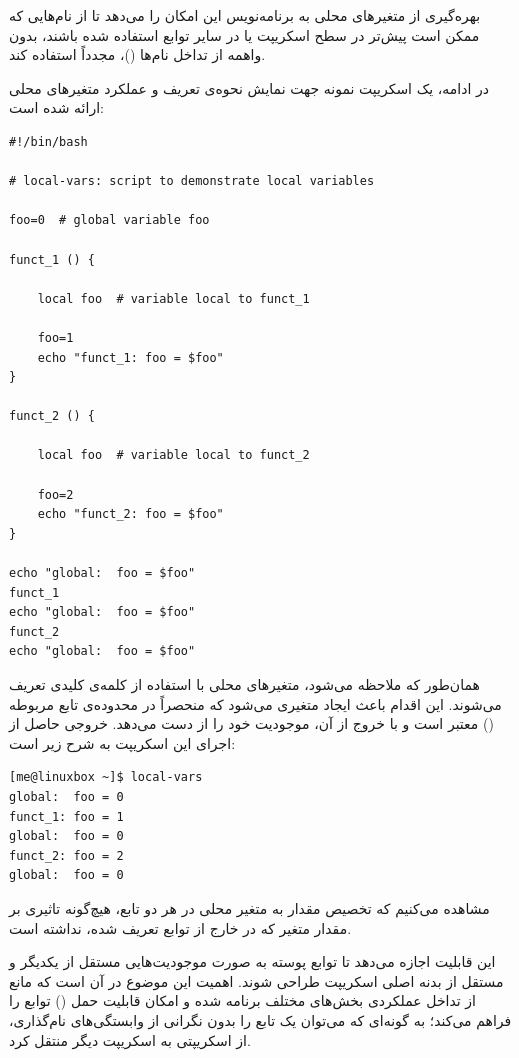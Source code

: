 بهره‌گیری از متغیرهای محلی به برنامه‌نویس این امکان را می‌دهد تا از نام‌هایی که ممکن است پیش‌تر در سطح اسکریپت یا در سایر توابع استفاده شده باشند، بدون واهمه از تداخل نام‌ها ()، مجدداً استفاده کند.

در ادامه، یک اسکریپت نمونه جهت نمایش نحوه‌ی تعریف و عملکرد متغیرهای محلی ارائه شده است:

\begin{latin}
\begin{lstlisting}
#!/bin/bash

# local-vars: script to demonstrate local variables

foo=0  # global variable foo

funct_1 () {

    local foo  # variable local to funct_1

    foo=1
    echo "funct_1: foo = $foo"
}

funct_2 () {

    local foo  # variable local to funct_2

    foo=2
    echo "funct_2: foo = $foo"
}

echo "global:  foo = $foo"
funct_1
echo "global:  foo = $foo"
funct_2
echo "global:  foo = $foo"
\end{lstlisting}
\end{latin}

همان‌طور که ملاحظه می‌شود، متغیرهای محلی با استفاده از کلمه‌ی کلیدی  تعریف می‌شوند. این اقدام باعث ایجاد متغیری می‌شود که منحصراً در محدوده‌ی تابع مربوطه () معتبر است و با خروج از آن، موجودیت خود را از دست می‌دهد. خروجی حاصل از اجرای این اسکریپت به شرح زیر است:

\begin{latin}
\begin{lstlisting}
[me@linuxbox ~]$ local-vars
global:  foo = 0
funct_1: foo = 1
global:  foo = 0
funct_2: foo = 2
global:  foo = 0
\end{lstlisting}
\end{latin}

مشاهده می‌کنیم که تخصیص مقدار به متغیر محلی  در هر دو تابع، هیچ‌گونه تاثیری بر مقدار متغیر  که در خارج از توابع تعریف شده، نداشته است.

این قابلیت اجازه می‌دهد تا توابع پوسته به صورت موجودیت‌هایی مستقل از یکدیگر و مستقل از بدنه اصلی اسکریپت طراحی شوند. اهمیت این موضوع در آن است که مانع از تداخل عملکردی بخش‌های مختلف برنامه شده و امکان قابلیت حمل () توابع را فراهم می‌کند؛ به گونه‌ای که می‌توان یک تابع را بدون نگرانی از وابستگی‌های نام‌گذاری، از اسکریپتی به اسکریپت دیگر منتقل کرد.

